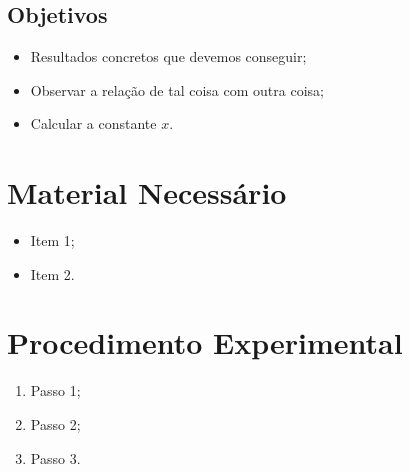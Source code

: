 \subsection{Objetivos}

\begin{itemize}
	\item Resultados concretos que devemos conseguir;
	\item Observar a relação de tal coisa com outra coisa;
	\item Calcular a constante $x$.
\end{itemize}

\section{Material Necessário}

\begin{itemize}
	\item Item 1;
	\item Item 2.
\end{itemize}

\section{Procedimento Experimental}

\begin{enumerate}
	\item Passo 1;
	\item Passo 2;
	\item Passo 3.
\end{enumerate}

\cleardoublepage

